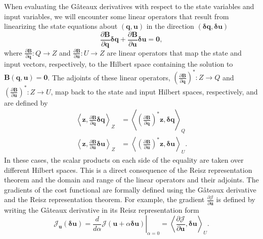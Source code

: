 When evaluating the G\^{a}teaux derivatives with respect to the state variables and input variables, we will encounter some linear operators that result from linearizing the state equations about $\left(\mathbf{q}, \mathbf{u}\right)$ in the direction $\left(\boldsymbol \delta \mathbf{q}, \boldsymbol \delta  \mathbf{u}\right)$
\begin{equation}
\frac{\partial \mathbf{B}}{\partial \mathbf{q}} \boldsymbol \delta \mathbf{q} + \frac{\partial \mathbf{B}}{\partial \mathbf{u}} \boldsymbol \delta \mathbf{u} = \mathbf{0},
\end{equation}
where $\frac{\partial \mathbf{B}}{\partial \mathbf{q}} : Q \rightarrow Z$ and  $\frac{\partial \mathbf{B}}{\partial \mathbf{u}} : U \rightarrow Z$ are linear operators that map the state and input vectors, respectively, to the Hilbert space containing the solution to $ \mathbf{B}(\mathbf{q}, \mathbf{u}) = \mathbf{0}$. The adjoints of these linear operators, $\left(\frac{\partial \mathbf{B}}{\partial \mathbf{q}} \right)^* : Z \rightarrow Q$ and $\left(\frac{\partial \mathbf{B}}{\partial \mathbf{u}} \right)^* : Z \rightarrow U$, map back to the state and input Hilbert spaces, respectively, and are defined by
\begin{align}
\left \langle \mathbf{z}, \frac{\partial \mathbf{B}}{\partial \mathbf{q}} \boldsymbol \delta \mathbf{q} \right \rangle_Z&=
\left \langle\left(\frac{\partial \mathbf{B}}{\partial \mathbf{q}} \right)^*  \mathbf{z}, \boldsymbol \delta \mathbf{q} \right \rangle_Q \\
\left \langle \mathbf{z}, \frac{\partial \mathbf{B}}{\partial \mathbf{u}} \boldsymbol \delta \mathbf{u} \right \rangle_Z&=
\left \langle\left(\frac{\partial \mathbf{B}}{\partial \mathbf{u}} \right)^*  \mathbf{z}, \boldsymbol \delta \mathbf{u} \right \rangle_U.
\end{align}
In these cases, the scalar products on each side of the equality are taken over different Hilbert spaces. This is a direct consequence of the Reisz representation theorem and the domain and range of the linear operators and their adjoints. The gradients of the cost functional are formally defined using the G\^{a}teaux derivative and the Reisz representation theorem. For example, the gradient $\frac{\partial \mathcal{J}}{\partial \mathbf{u}}$ is defined by writing the G\^{a}teaux derivative in its Reisz representation form
\begin{equation}
\mathcal{J}_\mathbf{u}(\boldsymbol \delta \mathbf{u}) = \left. \frac{d}{d\alpha} \mathcal{J}(\mathbf{u} + \alpha \boldsymbol \delta \mathbf{u}) \right\vert_{\alpha=0} = \left \langle \frac{\partial \mathcal{J}}{\partial \mathbf{u}}, \boldsymbol \delta \mathbf{u} \right \rangle_U.
\end{equation}

